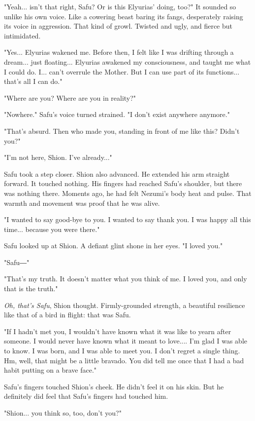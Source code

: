 "Yeah... isn't that right, Safu? Or is this Elyurias' doing, too?" It
sounded so unlike his own voice. Like a cowering beast baring its fangs,
desperately raising its voice in aggression. That kind of growl. Twisted
and ugly, and fierce but intimidated.

"Yes... Elyurias wakened me. Before then, I felt like I was drifting
through a dream... just floating... Elyurias awakened my consciousness,
and taught me what I could do. I... can't overrule the Mother. But I can
use part of its functions... that's all I can do."

"Where are you? Where are you in reality?"

"Nowhere." Safu's voice turned strained. "I don't exist anywhere
anymore."

"That's absurd. Then who made you, standing in front of me like this?
Didn't you?"

"I'm not here, Shion. I've already..."

Safu took a step closer. Shion also advanced. He extended his arm
straight forward. It touched nothing. His fingers had reached Safu's
shoulder, but there was nothing there. Moments ago, he had felt Nezumi's
body heat and pulse. That warmth and movement was proof that he was
alive.

"I wanted to say good-bye to you. I wanted to say thank you. I was happy
all this time... because you were there."

Safu looked up at Shion. A defiant glint shone in her eyes. "I loved
you."

"Safu―"

"That's my truth. It doesn't matter what you think of me. I loved you,
and only that is the truth."

\emph{Oh, that's Safu}, Shion thought. Firmly-grounded strength, a beautiful
resilience like that of a bird in flight: that was Safu.

"If I hadn't met you, I wouldn't have known what it was like to yearn
after someone. I would never have known what it meant to love.... I'm
glad I was able to know. I was born, and I was able to meet you. I don't
regret a single thing. Hm, well, that might be a little bravado. You did
tell me once that I had a bad habit putting on a brave face."

Safu's fingers touched Shion's cheek. He didn't feel it on his skin. But
he definitely did feel that Safu's fingers had touched him.

"Shion... you think so, too, don't you?"

